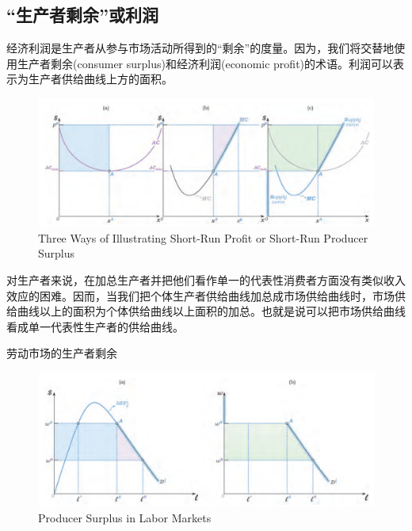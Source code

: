 \documentclass{article}
\begin{document}
\subsection{“生产者剩余”或利润}
经济利润是生产者从参与市场活动所得到的“剩余”的度量。因为，我们将交替地使用生产者剩余(consumer surplus)和经济利润(economic profit)的术语。利润可以表示为生产者供给曲线上方的面积。

\begin{figure}[H] %
	\centering %
	\includegraphics[width=1\textwidth]{15_2} %
	\caption{Three Ways of Illustrating Short-Run Profit or Short-Run Producer Surplus} %
	\label{Fig.main3} %
\end{figure}

对生产者来说，在加总生产者并把他们看作单一的代表性消费者方面没有类似收入效应的困难。因而，当我们把个体生产者供给曲线加总成市场供给曲线时，市场供给曲线以上的面积为个体供给曲线以上面积的加总。也就是说可以把市场供给曲线看成单一代表性生产者的供给曲线。

劳动市场的生产者剩余

\begin{figure}[H] %
	\centering %
	\includegraphics[width=1\textwidth]{15_3} %
	\caption{Producer Surplus in Labor Markets} %
	\label{Fig.main4} %
\end{figure}
\end{document}
